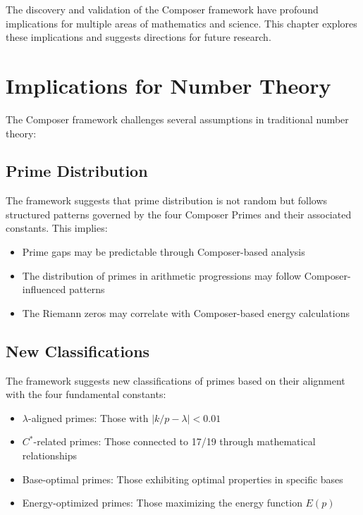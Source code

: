 \documentclass[12pt,a4paper]{report}
\newcommand{\Cstar}{C^*}
\begin{document}
The discovery and validation of the Composer framework have profound implications for multiple areas of mathematics and science. This chapter explores these implications and suggests directions for future research.

\section{Implications for Number Theory}

The Composer framework challenges several assumptions in traditional number theory:

\subsection{Prime Distribution}

The framework suggests that prime distribution is not random but follows structured patterns governed by the four Composer Primes and their associated constants. This implies:

\begin{itemize}
\item Prime gaps may be predictable through Composer-based analysis
\item The distribution of primes in arithmetic progressions may follow Composer-influenced patterns
\item The Riemann zeros may correlate with Composer-based energy calculations
\end{itemize}

\subsection{New Classifications}

The framework suggests new classifications of primes based on their alignment with the four fundamental constants:

\begin{itemize}
\item $\lambda$-aligned primes: Those with $|k/p - \lambda| < 0.01$
\item $\Cstar$-related primes: Those connected to 17/19 through mathematical relationships
\item Base-optimal primes: Those exhibiting optimal properties in specific bases
\item Energy-optimized primes: Those maximizing the energy function $E(p)$
\end{itemize}
\end{document}
